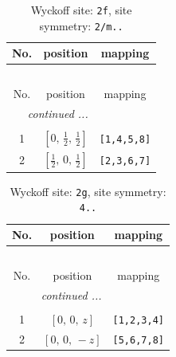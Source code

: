 \documentclass[fleqn,8pt]{jsarticle}
\begin{document}
\renewcommand{\arraystretch}{1.2}
\begin{longtable}{ccc}
\caption{Wyckoff site: {\tt 2f}, site symmetry: {\tt 2/m..}}
 \\
 \hline \hline
No. & position & mapping \\ \hline \endfirsthead

\multicolumn{2}{l}{\tablename\ \thetable{}} \\
 \hline \hline
No. & position & mapping \\ \hline \endhead

 \hline \hline
\multicolumn{2}{r}{\footnotesize\it continued ...} \\ \endfoot

 \hline \hline
\multicolumn{2}{r}{} \\ \endlastfoot

1 & $\left[ 0,\, \frac{1}{2},\, \frac{1}{2} \right]$ & {\tt [1,4,5,8]} \\ \hline
2 & $\left[ \frac{1}{2},\, 0,\, \frac{1}{2} \right]$ & {\tt [2,3,6,7]} \\
\end{longtable}
\renewcommand{\arraystretch}{1.2}
\begin{longtable}{ccc}
\caption{Wyckoff site: {\tt 2g}, site symmetry: {\tt 4..}}
 \\
 \hline \hline
No. & position & mapping \\ \hline \endfirsthead

\multicolumn{2}{l}{\tablename\ \thetable{}} \\
 \hline \hline
No. & position & mapping \\ \hline \endhead

 \hline \hline
\multicolumn{2}{r}{\footnotesize\it continued ...} \\ \endfoot

 \hline \hline
\multicolumn{2}{r}{} \\ \endlastfoot

1 & $\left[ 0,\, 0,\, z \right]$ & {\tt [1,2,3,4]} \\ \hline
2 & $\left[ 0,\, 0,\, - z \right]$ & {\tt [5,6,7,8]} \\
\end{longtable}
\renewcommand{\arraystretch}{1.2}
\end{document}
